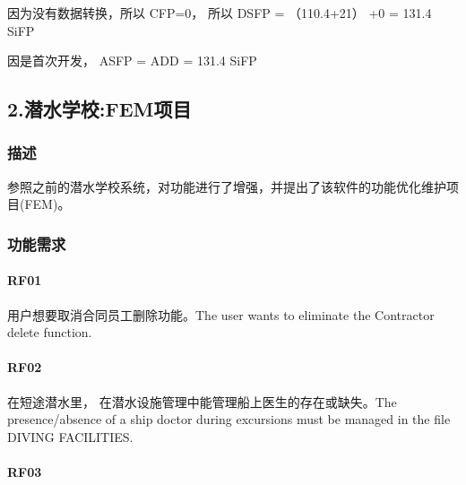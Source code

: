 \begin{description}
\item[]
\end{description}

因为没有数据转换，所以 CFP=0， 所以 DSFP = （110.4+21） +0 = 131.4 SiFP

因是首次开发， ASFP = ADD = 131.4 SiFP

\hypertarget{ux6f5cux6c34ux5b66ux6821femux9879ux76ee}{%
\subsection{2.潜水学校:FEM项目}\label{ux6f5cux6c34ux5b66ux6821femux9879ux76ee}}

\hypertarget{ux63cfux8ff0}{%
\subsubsection{描述}\label{ux63cfux8ff0}}

参照之前的潜水学校系统，对功能进行了增强，并提出了该软件的功能优化维护项目(FEM)。

\hypertarget{ux529fux80fdux9700ux6c42}{%
\subsubsection{功能需求}\label{ux529fux80fdux9700ux6c42}}

\hypertarget{rf01}{%
\paragraph{RF01}\label{rf01}}

用户想要取消合同员工删除功能。The user wants to eliminate the Contractor
delete function.

\hypertarget{rf02}{%
\paragraph{RF02}\label{rf02}}

在短途潜水里， 在潜水设施管理中能管理船上医生的存在或缺失。The
presence/absence of a ship doctor during excursions must be managed in
the file DIVING FACILITIES.

\hypertarget{rf03}{%
\paragraph{RF03}\label{rf03}}

